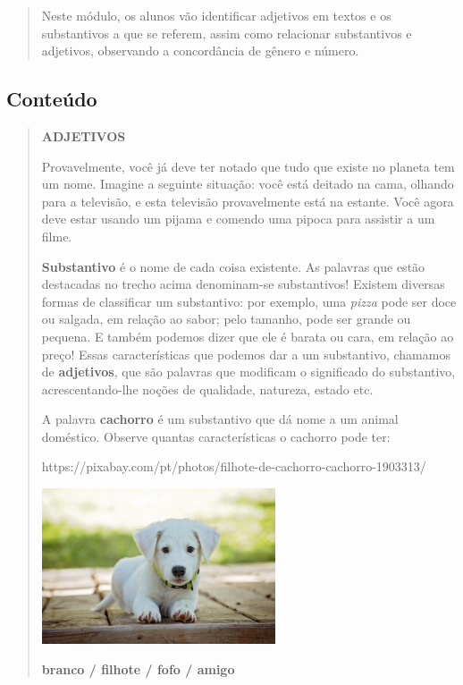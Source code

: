 \begin{quote}
Neste módulo, os alunos vão identificar adjetivos em textos e os
substantivos a que se referem, assim como relacionar substantivos e
adjetivos, observando a concordância de gênero e número.
\end{quote}

\subsection{Conteúdo}\label{conteuxfado-6}

\begin{quote}
\textbf{ADJETIVOS}

Provavelmente, você já deve ter notado que tudo que existe no planeta
tem um nome. Imagine a seguinte situação: você está deitado na cama,
olhando para a televisão, e esta televisão provavelmente está na
estante. Você agora deve estar usando um pijama e comendo uma pipoca
para assistir a um filme.

\textbf{Substantivo} é o nome de cada coisa existente. As palavras que
estão destacadas no trecho acima denominam-se substantivos! Existem
diversas formas de classificar um substantivo: por exemplo, uma
\emph{pizza} pode ser doce ou salgada, em relação ao sabor; pelo
tamanho, pode ser grande ou pequena. E também podemos dizer que ele é
barata ou cara, em relação ao preço! Essas características que podemos
dar a um substantivo, chamamos de \textbf{adjetivos}, que são palavras
que modificam o significado do substantivo, acrescentando-lhe noções de
qualidade, natureza, estado etc.

A palavra \textbf{cachorro} é um substantivo que dá nome a um animal
doméstico. Observe quantas características o cachorro pode ter:

https://pixabay.com/pt/photos/filhote-de-cachorro-cachorro-1903313/

\includegraphics[width=2.71875in,height=1.81239in]{media/image21.jpeg}

\textbf{branco / filhote / fofo / amigo}


\end{quote}
